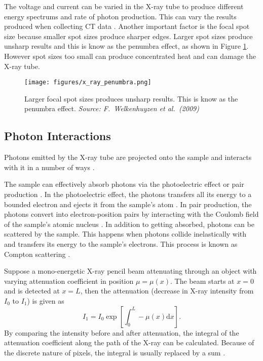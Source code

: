 \documentclass[12pt, a4paper]{memoir}
\newcommand{\diff}{\mathrm{d}}
\begin{document}
The voltage and current can be varied in the X-ray tube to produce different energy spectrums and rate of photon production. This can vary the results produced when collecting CT data \citep{cantatore2011introduction}. Another important factor is the focal spot size because smaller spot sizes produce sharper edges. Larger spot sizes produce unsharp results and this is know as the penumbra effect, as shown in Figure \ref{fig:x_ray_penumbra}. However spot sizes too small can produce concentrated heat \citep{welkenhuyzen2009industrial} and can damage the X-ray tube.

\begin{figure}
	\centering
	\texttt{[image: figures/x\_ray\_penumbra.png]}
	\caption{Larger focal spot sizes produces unsharp results. This is know as the penumbra effect. \emph{Source: F.~Welkenhuyzen et al.~(2009)\citep{welkenhuyzen2009industrial}}}
	\label{fig:x_ray_penumbra}
\end{figure}

\subsection{Photon Interactions}
Photons emitted by the X-ray tube are projected onto the sample and interacts with it in a number of ways \citep{cantatore2011introduction}.

The sample can effectively absorb photons via the photoelectric effect or pair production \citep{cantatore2011introduction}. In the photoelectric effect, the photons transfers all its energy to a bounded electron and ejects it from the sample's atom \citep{millikan1916direct}. In pair production, the photons convert into electron-position pairs by interacting with the Coulomb field of the sample's atomic nucleus \citep{hubbell2006electron}. In addition to getting absorbed, photons can be scattered by the sample. This happens when photons collide inelastically with and transfers its energy to the sample's electrons. This process is known as Compton scattering \citep{compton1923quantum}.

Suppose a mono-energetic X-ray pencil beam attenuating through an object with varying attenuation coefficient in position $\mu=\mu(x)$. The beam starts at $x=0$ and is detected at $x=L$, then the attenuation (decrease in X-ray intensity from $I_0$ to $I_1$) is given as \citep{cantatore2011introduction}
\begin{equation}
	I_1 = I_0\exp\left[\int_0^L-\mu(x)\diff x\right].\label{eq:beerLaw}
\end{equation}
By comparing the intensity before and after attenuation, the integral of the attenuation coefficient along the path of the X-ray can be calculated. Because of the discrete nature of pixels, the integral is usually replaced by a sum \citep{michael2001x}. 
\end{document}

